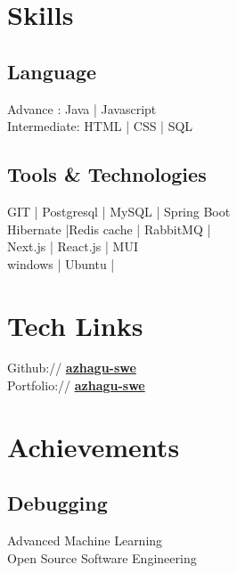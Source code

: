 \documentclass[]{azhagu-swe-resume-openfont}
\begin{document}
\begin{minipage}[t]{0.33\textwidth}
\section{Skills}
\subsection{Language}
 Advance : Java | Javascript \\
 Intermediate: HTML | CSS | SQL \\ 
\subsection{Tools \& Technologies}
 GIT | Postgresql | MySQL | Spring Boot \\
 Hibernate |Redis cache | RabbitMQ | \\ 
 Next.js | React.js | MUI\\
 windows | Ubuntu |\\
 
\sectionsep


\section{Tech Links} 
Github:// \href{https://github.com/azhagu-swe}{\bf azhagu-swe} \\
Portfolio://  \href{https://azhagu-swe.github.io/portfolio/}{\bf azhagu-swe} \\


\section{Achievements}
\subsection{Debugging}
Advanced Machine Learning \\
Open Source Software Engineering \\


\end{minipage}
\end{document}
